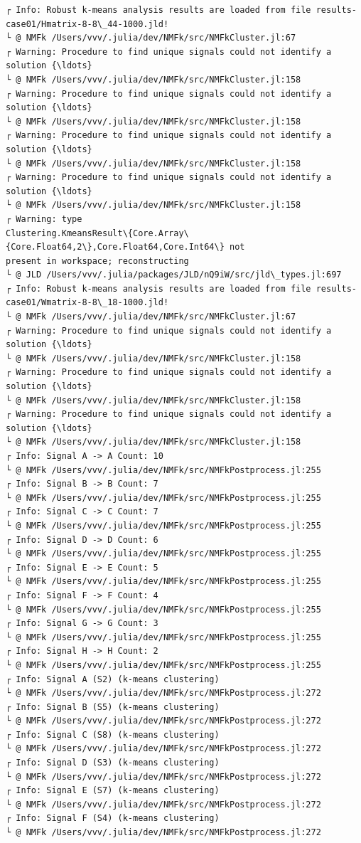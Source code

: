 \documentclass[11pt]{article}
\begin{document}
    
    \begin{Verbatim}[commandchars=\\\{\}]
┌ Info: Robust k-means analysis results are loaded from file results-
case01/Hmatrix-8-8\_44-1000.jld!
└ @ NMFk /Users/vvv/.julia/dev/NMFk/src/NMFkCluster.jl:67
┌ Warning: Procedure to find unique signals could not identify a solution {\ldots}
└ @ NMFk /Users/vvv/.julia/dev/NMFk/src/NMFkCluster.jl:158
┌ Warning: Procedure to find unique signals could not identify a solution {\ldots}
└ @ NMFk /Users/vvv/.julia/dev/NMFk/src/NMFkCluster.jl:158
┌ Warning: Procedure to find unique signals could not identify a solution {\ldots}
└ @ NMFk /Users/vvv/.julia/dev/NMFk/src/NMFkCluster.jl:158
┌ Warning: Procedure to find unique signals could not identify a solution {\ldots}
└ @ NMFk /Users/vvv/.julia/dev/NMFk/src/NMFkCluster.jl:158
┌ Warning: type
Clustering.KmeansResult\{Core.Array\{Core.Float64,2\},Core.Float64,Core.Int64\} not
present in workspace; reconstructing
└ @ JLD /Users/vvv/.julia/packages/JLD/nQ9iW/src/jld\_types.jl:697
┌ Info: Robust k-means analysis results are loaded from file results-
case01/Wmatrix-8-8\_18-1000.jld!
└ @ NMFk /Users/vvv/.julia/dev/NMFk/src/NMFkCluster.jl:67
┌ Warning: Procedure to find unique signals could not identify a solution {\ldots}
└ @ NMFk /Users/vvv/.julia/dev/NMFk/src/NMFkCluster.jl:158
┌ Warning: Procedure to find unique signals could not identify a solution {\ldots}
└ @ NMFk /Users/vvv/.julia/dev/NMFk/src/NMFkCluster.jl:158
┌ Warning: Procedure to find unique signals could not identify a solution {\ldots}
└ @ NMFk /Users/vvv/.julia/dev/NMFk/src/NMFkCluster.jl:158
┌ Info: Signal A -> A Count: 10
└ @ NMFk /Users/vvv/.julia/dev/NMFk/src/NMFkPostprocess.jl:255
┌ Info: Signal B -> B Count: 7
└ @ NMFk /Users/vvv/.julia/dev/NMFk/src/NMFkPostprocess.jl:255
┌ Info: Signal C -> C Count: 7
└ @ NMFk /Users/vvv/.julia/dev/NMFk/src/NMFkPostprocess.jl:255
┌ Info: Signal D -> D Count: 6
└ @ NMFk /Users/vvv/.julia/dev/NMFk/src/NMFkPostprocess.jl:255
┌ Info: Signal E -> E Count: 5
└ @ NMFk /Users/vvv/.julia/dev/NMFk/src/NMFkPostprocess.jl:255
┌ Info: Signal F -> F Count: 4
└ @ NMFk /Users/vvv/.julia/dev/NMFk/src/NMFkPostprocess.jl:255
┌ Info: Signal G -> G Count: 3
└ @ NMFk /Users/vvv/.julia/dev/NMFk/src/NMFkPostprocess.jl:255
┌ Info: Signal H -> H Count: 2
└ @ NMFk /Users/vvv/.julia/dev/NMFk/src/NMFkPostprocess.jl:255
┌ Info: Signal A (S2) (k-means clustering)
└ @ NMFk /Users/vvv/.julia/dev/NMFk/src/NMFkPostprocess.jl:272
┌ Info: Signal B (S5) (k-means clustering)
└ @ NMFk /Users/vvv/.julia/dev/NMFk/src/NMFkPostprocess.jl:272
┌ Info: Signal C (S8) (k-means clustering)
└ @ NMFk /Users/vvv/.julia/dev/NMFk/src/NMFkPostprocess.jl:272
┌ Info: Signal D (S3) (k-means clustering)
└ @ NMFk /Users/vvv/.julia/dev/NMFk/src/NMFkPostprocess.jl:272
┌ Info: Signal E (S7) (k-means clustering)
└ @ NMFk /Users/vvv/.julia/dev/NMFk/src/NMFkPostprocess.jl:272
┌ Info: Signal F (S4) (k-means clustering)
└ @ NMFk /Users/vvv/.julia/dev/NMFk/src/NMFkPostprocess.jl:272
    \end{Verbatim}
\end{document}

